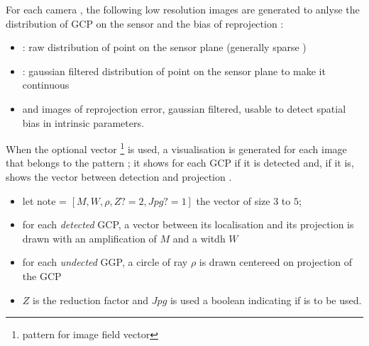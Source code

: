 \documentclass[a4paper]{article}
\begin{document}
\SecVisuRes

For each camera  \ParamCam, the following low resolution images are generated to anlyse the distribution of GCP on the sensor and
the bias of reprojection :

\begin{itemize}
   \item {}\ParamCam  : raw distribution of point on the sensor plane (generally sparse )
   \item {}\ParamCam \; : gaussian filtered distribution of point on the sensor plane to make it continuous
   \item  {}\ParamCam \; and  \ParamCam\;   images of reprojection error, gaussian filtered,
            usable to detect spatial bias in intrinsic parameters.
\end{itemize}


When the optional vector  \footnote{pattern for image  field vector} is used, a  visualisation  is generated for each image
that belongs to the pattern ; 
it shows for each GCP if it is
detected and, if it is,  shows the vector between detection and projection .

\begin{itemize}
   \item let note = $[M,W,\rho,Z?=2,Jpg?=1]$ the vector of size $3$ to $5$;
   \item  for each \emph{detected} GCP, a vector between its localisation and its projection  is drawn with an amplification of $M$ and a witdh $W$
   \item for each \emph{undected} GGP, a circle of ray $\rho$ is drawn centereed on projection  of the GCP
   \item $Z$ is the reduction factor and $Jpg$ is used a boolean indicating if   is to be used.
\end{itemize}
\end{document}
